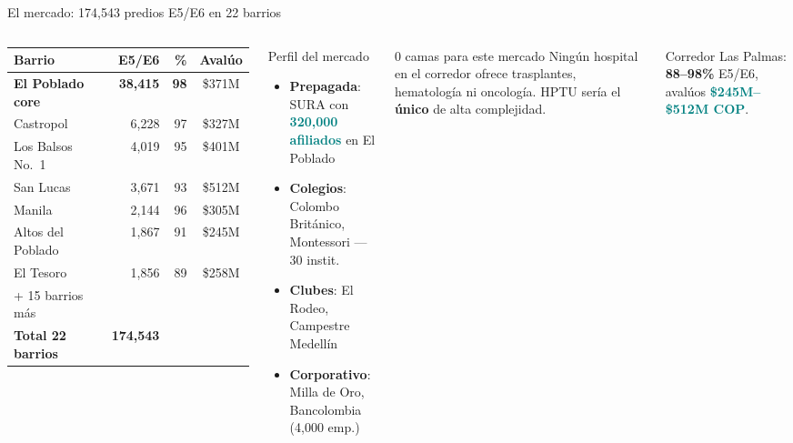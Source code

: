 \documentclass[aspectratio=169, 11pt]{beamer}
\newcommand{\highlight}[1]{\textcolor{teal}{\textbf{#1}}}
\newcommand{\src}[1]{\par\vspace{2pt}{\tiny\textcolor{slate}{Fuente: #1}}}
\begin{document}
\begin{frame}{El mercado: 174,543 predios E5/E6 en 22 barrios}

\begin{columns}[T]
\vspace{-2pt}
{\scriptsize\setlength{\tabcolsep}{3pt}
\begin{tabular}{@{}lrrc@{}}
\toprule
\textbf{Barrio} & \textbf{E5/E6} & \textbf{\%} & \textbf{Avalúo} \\
\midrule
\rowcolor{teal!8}
\textbf{El Poblado core} & \textbf{38,415} & \textbf{98} & \$371M \\
Castropol & 6,228 & 97 & \$327M \\
Los Balsos No.\ 1 & 4,019 & 95 & \$401M \\
San Lucas & 3,671 & 93 & \$512M \\
Manila & 2,144 & 96 & \$305M \\
\rowcolor{teal!6}
Altos del Poblado & 1,867 & 91 & \$245M \\
El Tesoro & 1,856 & 89 & \$258M \\
{\tiny + 15 barrios más} & & & \\
\midrule
\textbf{Total 22 barrios} & \textbf{174,543} & & \\
\bottomrule
\end{tabular}
}

\vspace{3pt}
\src{Catastro Municipal Medellín (bp59-rj8r), 1,041,413 predios}

\vspace{-2pt}
\begin{exampleblock}{\small Perfil del mercado}
\scriptsize
\begin{itemize}\setlength{\itemsep}{0pt}\setlength{\parskip}{0pt}
  \item \textbf{Prepagada}: SURA con \highlight{320,000 afiliados} en El Poblado
  \item \textbf{Colegios}: Colombo Británico, Montessori --- 30 instit.
  \item \textbf{Clubes}: El Rodeo, Campestre Medellín
  \item \textbf{Corporativo}: Milla de Oro, Bancolombia (4,000 emp.)
\end{itemize}
\end{exampleblock}

\vspace{2pt}
\begin{alertblock}{\small 0 camas para este mercado}
\scriptsize Ningún hospital en el corredor ofrece trasplantes, hematología ni oncología. HPTU sería el \textbf{único} de alta complejidad.
\end{alertblock}

\vspace{2pt}
{\scriptsize Corredor Las Palmas: \textbf{88--98\%} E5/E6, avalúos \highlight{\$245M--\$512M COP}.}
\end{columns}
\end{frame}
\end{document}
